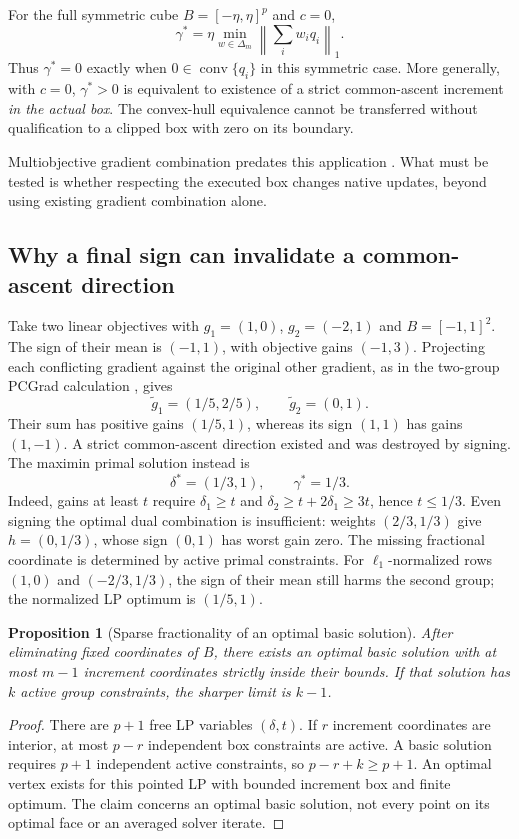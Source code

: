\documentclass[10pt,a4paper]{article}
\newtheorem{proposition}{Proposition}[section]
\newcommand{\norm}[1]{\left\|#1\right\|}
\newcommand{\simplex}{\Delta_m}
\begin{document}
For the full symmetric cube $B=[-\eta,\eta]^p$ and $c=0$,
\begin{equation}\label{eq:l1dual}
 \gamma^*=\eta\min_{w\in\simplex}\norm{\textstyle\sum_iw_iq_i}_1.
\end{equation}
Thus $\gamma^*=0$ exactly when $0\in\operatorname{conv}\{q_i\}$ in this
symmetric case. More generally, with $c=0$, $\gamma^*>0$ is equivalent to
existence of a strict common-ascent increment \emph{in the actual box}.
The convex-hull equivalence cannot be transferred without qualification to a
clipped box with zero on its boundary.

Multiobjective gradient combination predates this application
\cite{sener,pcgrad}. What must be tested is whether respecting the executed
box changes native updates, beyond using existing gradient combination alone.

\newpage
\subsection*{Why a final sign can invalidate a common-ascent direction}
Take two linear objectives with $g_1=(1,0)$, $g_2=(-2,1)$ and
$B=[-1,1]^2$. The sign of their mean is $(-1,1)$, with objective gains
$(-1,3)$. Projecting each conflicting gradient against the original other
gradient, as in the two-group PCGrad calculation \cite{pcgrad}, gives
\[
 \widetilde g_1=(1/5,2/5),\qquad \widetilde g_2=(0,1).
\]
Their sum has positive gains $(1/5,1)$, whereas its sign $(1,1)$ has gains
$(1,-1)$. A strict common-ascent direction existed and was destroyed by signing.
The maximin primal solution instead is
\[
 \delta^*=(1/3,1),\qquad \gamma^*=1/3.
\]
Indeed, gains at least $t$ require $\delta_1\geq t$ and
$\delta_2\geq t+2\delta_1\geq3t$, hence $t\leq1/3$.
Even signing the optimal dual combination is insufficient: weights
$(2/3,1/3)$ give $h=(0,1/3)$, whose sign $(0,1)$ has worst gain zero.
The missing fractional coordinate is determined by active primal constraints.
For $\ell_1$-normalized rows $(1,0)$ and $(-2/3,1/3)$, the sign of their mean
still harms the second group; the normalized LP optimum is $(1/5,1)$.

\begin{proposition}[Sparse fractionality of an optimal basic solution]
After eliminating fixed coordinates of $B$, there exists an optimal basic
solution with at most $m-1$ increment coordinates strictly inside their bounds.
If that solution has $k$ active group constraints, the sharper limit is $k-1$.
\end{proposition}
\begin{proof}
There are $p+1$ free LP variables $(\delta,t)$. If $r$ increment coordinates
are interior, at most $p-r$ independent box constraints are active. A basic
solution requires $p+1$ independent active constraints, so
$p-r+k\geq p+1$. An optimal vertex exists for this pointed LP with bounded
increment box and finite optimum. The claim concerns an optimal basic
solution, not every point on its optimal face or an averaged solver iterate.
\end{proof}
\end{document}
